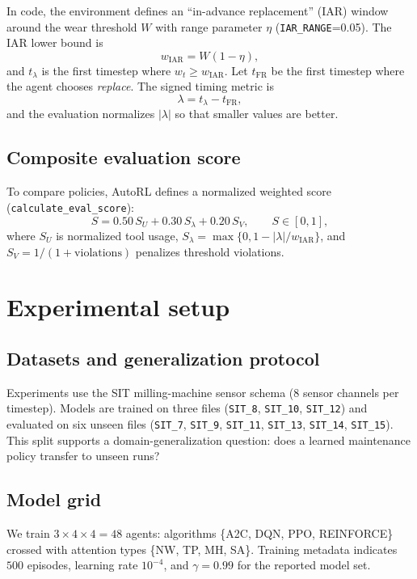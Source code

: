 \documentclass[11pt]{article}
\begin{document}
In code, the environment defines an ``in-advance replacement'' (IAR) window around the wear threshold $W$ with range parameter $\eta$ (\texttt{IAR\_RANGE}=0.05). The IAR lower bound is
\begin{equation}
  w_{\text{IAR}} = W(1-\eta),
\end{equation}
and $t_\lambda$ is the first timestep where $w_t\ge w_{\text{IAR}}$. Let $t_{\text{FR}}$ be the first timestep where the agent chooses \emph{replace}. The signed timing metric is
\begin{equation}
  \lambda = t_\lambda - t_{\text{FR}},
\end{equation}
and the evaluation normalizes $|\lambda|$ so that smaller values are better.

\subsection{Composite evaluation score}
To compare policies, AutoRL defines a normalized weighted score (\texttt{calculate\_eval\_score}):
\begin{equation}
  S = 0.50\,S_U + 0.30\,S_\lambda + 0.20\,S_V, \qquad S\in[0,1],
\end{equation}
where $S_U$ is normalized tool usage, $S_\lambda = \max\{0,1-|\lambda|/w_{\text{IAR}}\}$, and $S_V=1/(1+\text{violations})$ penalizes threshold violations.

\section{Experimental setup}
\subsection{Datasets and generalization protocol}
Experiments use the SIT milling-machine sensor schema (8 sensor channels per timestep). Models are trained on three files (\texttt{SIT\_8}, \texttt{SIT\_10}, \texttt{SIT\_12}) and evaluated on six unseen files (\texttt{SIT\_7}, \texttt{SIT\_9}, \texttt{SIT\_11}, \texttt{SIT\_13}, \texttt{SIT\_14}, \texttt{SIT\_15}). This split supports a domain-generalization question: does a learned maintenance policy transfer to unseen runs?

\subsection{Model grid}
We train $3\times 4\times 4 = 48$ agents: algorithms \{\textsc{A2C}, \textsc{DQN}, \textsc{PPO}, \textsc{REINFORCE}\} crossed with attention types \{NW, TP, MH, SA\}. Training metadata indicates $500$ episodes, learning rate $10^{-4}$, and $\gamma=0.99$ for the reported model set.
\end{document}
